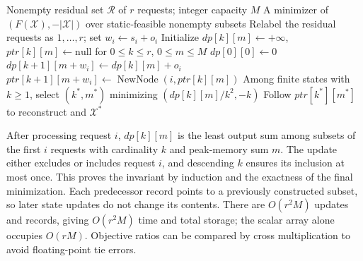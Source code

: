 \documentclass[nonblindrev]{informs3_hide}
\begin{document}
\begin{algorithm}[htbp]
\caption{Exact static batch selection by dynamic programming}
\label{alg:exact_dp}
\begin{algorithmic}[1]
\Require Nonempty residual set $\mathcal R$ of $r$ requests; integer capacity $M$
\Ensure A minimizer of $(F(\mathcal X),-|\mathcal X|)$ over static-feasible nonempty subsets
\State Relabel the residual requests as $1,\ldots,r$; set $w_i\gets s_i+o_i$
\State Initialize $dp[k][m]\gets+\infty$, $ptr[k][m]\gets\mathrm{null}$ for $0\le k\le r$, $0\le m\le M$
\State $dp[0][0]\gets0$
        \State $dp[k+1][m+w_i]\gets dp[k][m]+o_i$
        \State $ptr[k+1][m+w_i]\gets\operatorname{NewNode}(i,ptr[k][m])$ 
      \EndIf
    \EndFor
  \EndFor
\EndFor
\State Among finite states with $k\ge1$, select $(k^*,m^*)$ minimizing $(dp[k][m]/k^2,-k)$
\State Follow $ptr[k^*][m^*]$ to reconstruct and \Return $\mathcal X^*$
\end{algorithmic}
\end{algorithm}

After processing request $i$, $dp[k][m]$ is the least
output sum among subsets of the first $i$ requests with cardinality $k$
and peak-memory sum $m$. The update either excludes or includes request
$i$, and descending $k$ ensures its inclusion at most once. This proves
the invariant by induction and the exactness of the final minimization.
Each predecessor record points to a previously constructed subset, so
later state updates do not change its contents. There are $O(r^2M)$
updates and records, giving $O(r^2M)$ time and total storage; the scalar
array alone occupies $O(rM)$. Objective ratios can be compared by cross
multiplication to avoid floating-point tie errors.
\end{document}
